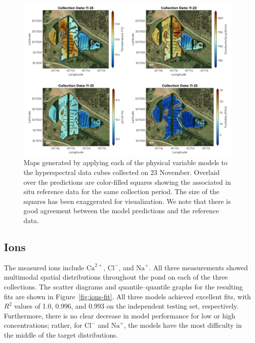 \documentclass[remotesensing,article,accept,pdftex,moreauthors]{Definitions/mdpi}
\begin{document}
\begin{figure}[H]

\vspace{-0.15in}
\hspace{-6pt}\includegraphics[width=0.9\columnwidth]{figures/results/maps/physical.pdf}
\vspace{-0.05in}
\caption{Maps generated by applying each of the physical variable models to the hyperspectral data cubes collected on 23 November. Overlaid over the predictions are color-filled squares showing the associated in situ reference data for the same collection period. The size of the squares has been exaggerated for visualization. We note that there is good agreement between the model predictions and the reference data. \label{fig:map-physical}}
\end{figure}  



\subsection{Ions}

The measured ions include $\mathrm{Ca}^{2+}$, $\mathrm{Cl}^{-}$, and $\mathrm{Na}^{+}$. All three measurements showed multimodal spatial distributions throughout the pond on each of the three collections. The scatter diagrams and quantile--quantile graphs for the resulting fits are shown in Figure~\ref{fig:ions-fit}. All three models achieved excellent fits, with $R^2$ values of 1.0, 0.996, and 0.993 on the independent testing set, respectively. Furthermore, there is no clear decrease in model performance for low or high concentrations; rather, for $\textrm{Cl}^{-}$ and $\textrm{Na}^{+}$, the models have the most difficulty in the middle of the target distributions. 
\end{document}
